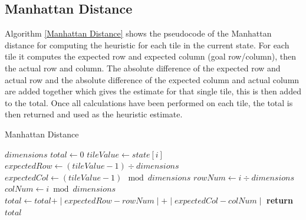 \documentclass[final]{cmpreport}
\begin{document}
\subsection{Manhattan Distance}
Algorithm \ref{Manhattan Distance} shows the pseudocode of the Manhattan distance for computing the heuristic for each tile in the current state. For each tile it computes the expected row and expected column (goal row/column), then the actual row and column. The absolute difference of the expected row and actual row and the absolute difference of the  expected column and actual column are added together which gives the estimate for that single tile, this is then added to the total. Once all calculations have been performed on each tile, the total is then returned and used as the heuristic estimate.

\begin{algorithm}
	\caption{Manhattan Distance}\label{Manhattan Distance}
	\begin{algorithmic}[1]
		\State$dimensions$ 
			
		\State$total\gets 0$
			
		\State $tileValue\gets state[i]$
		\State $expectedRow\gets (tileValue -1)\div dimensions$
		\State $expectedCol\gets (tileValue -1)\mod dimensions$
		\State $rowNum \gets i\div dimensions$
		\State $colNum\gets i \bmod dimensions$
		\State $total\gets total \texttt{+} \mid{expectedRow-rowNum}\mid\texttt{+}\mid{expectedCol-colNum}\mid$
		\EndFor
		\State \textbf{return} $total$
		\EndProcedure
	\end{algorithmic}
\end{algorithm}
\end{document}
